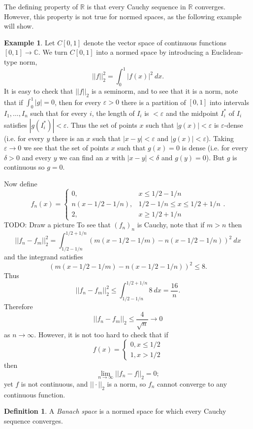 \documentclass[12pt]{book}
\newcommand{\RR}{\mathbb{R}}
\newcommand{\CC}{\mathbb{C}}
\newcommand{\dfn}[1]{\emph{#1}\index{#1}}
\theoremstyle{definition}
\newtheorem{definition}[theorem]{Definition}
\newtheorem{example}[theorem]{Example}
\begin{document}
The defining property of $\RR$ is that every Cauchy sequence in $\RR$ converges.
However, this property is not true for normed spaces, as the following example will show.
\begin{example}
Let $C[0, 1]$ denote the vector space of continuous functions $[0, 1] \to \CC$.
We turn $C[0, 1]$ into a normed space by introducing a Euclidean-type norm,
$$||f||_2^2 = \int_0^1 |f(x)|^2 ~dx.$$
It is easy to check that $||f||_2$ is a seminorm, and to see that it is a norm, note that if $\int_0^1 |g| = 0$, then for every $\varepsilon > 0$ there is a partition of $[0, 1]$ into intervals $I_1, \dots, I_n$ such that for every $i$, the length of $I_i$ is $<\varepsilon$ and the midpoint $I_i^*$ of $I_i$ satisfies $|g(I_i^*)| < \varepsilon$.
Thus the set of points $x$ such that $|g(x)| < \varepsilon$ is $\varepsilon$-dense (i.e. for every $y$ there is an $x$ such that $|x - y| < \varepsilon$ and $|g(x)| < \varepsilon$).
Taking $\varepsilon \to 0$ we see that the set of points $x$ such that $g(x) = 0$ is dense (i.e. for every $\delta > 0$ and every $y$ we can find an $x$ with $|x - y| < \delta$ and $g(y) = 0$).
But $g$ is continuous so $g = 0$.

Now define
$$f_n(x) = \begin{cases}
0, &x \leq 1/2 - 1/n\\
n(x - 1/2 - 1/n), &1/2 - 1/n \leq x \leq 1/2 + 1/n\\
2, &x \geq 1/2 + 1/n
\end{cases}.$$
TODO: Draw a picture
To see that $(f_n)_n$ is Cauchy, note that if $m > n$ then
$$||f_n - f_m||_2^2 = \int_{1/2-1/n}^{1/2+1/n} (m(x - 1/2 - 1/m) - n(x - 1/2 - 1/n))^2~dx$$
and the integrand satisfies
$$(m(x - 1/2 - 1/m) - n(x - 1/2 - 1/n))^2 \leq 8.$$
Thus
$$||f_n - f_m||_2^2 \leq \int_{1/2-1/n}^{1/2+1/n} 8~dx = \frac{16}{n}.$$
Therefore
$$||f_n - f_m||_2 \leq \frac{4}{\sqrt n} \to 0$$
as $n \to \infty$. However, it is not too hard to check that if
$$f(x) = \begin{cases}
0, x \leq 1/2\\
1, x > 1/2
\end{cases}$$
then
$$\lim_{n \to \infty} ||f_n - f||_2 = 0;$$
yet $f$ is not continuous, and $||\cdot||_2$ is a norm, so $f_n$ cannot converge to any continuous function.
\end{example}

\begin{definition}
A \dfn{Banach space} is a normed space for which every Cauchy sequence converges.
\end{definition}
\end{document}
